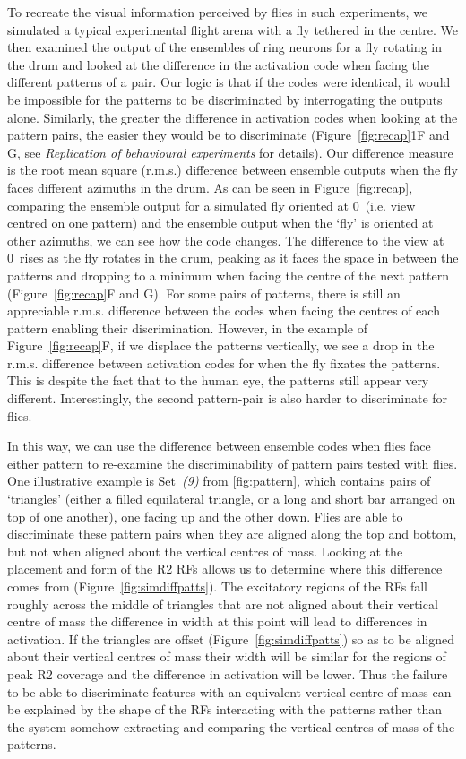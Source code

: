 \documentclass[10pt]{article}
\begin{document}
To recreate the visual information perceived by flies in such experiments, we simulated a typical experimental flight arena with a fly tethered in the centre. We then examined the output of the ensembles of ring neurons for a fly rotating in the drum and looked at the difference in the activation code when facing the different patterns of a pair. Our logic is that if the codes were identical, it would be impossible for the patterns to be discriminated by interrogating the outputs alone. Similarly, the greater the difference in activation codes when looking at the pattern pairs, the easier they would be to discriminate (Figure~\ref{fig:recap}1F and G, see \emph{Replication of behavioural experiments} for details). Our difference measure is the root mean square (r.m.s.) difference between ensemble outputs when the fly faces different azimuths in the drum. As can be seen in Figure~\ref{fig:recap}, comparing the ensemble output for a simulated fly oriented at 0\degree\ (i.e. view centred on one pattern) and the ensemble output when the ‘fly’ is oriented at other azimuths, we can see how the code changes. The difference to the view at 0\degree\ rises as the fly rotates in the drum, peaking as it faces the space in between the patterns and dropping to a minimum when facing the centre of the next pattern (Figure~\ref{fig:recap}F and G). For some pairs of patterns, there is still an appreciable r.m.s. difference between the codes when facing the centres of each pattern enabling their discrimination. However, in the example of Figure~\ref{fig:recap}F, if we displace the patterns vertically, we see a drop in the r.m.s. difference between activation codes for when the fly fixates the patterns. This is despite the fact that to the human eye, the patterns still appear very different. Interestingly, the second pattern-pair is also harder to discriminate for flies.

In this way, we can use the difference between ensemble codes when flies face either pattern to re-examine the discriminability of pattern pairs tested with flies. One illustrative example is Set~\emph{(9)} from \ref{fig:pattern}, which contains pairs of ‘triangles’ (either a filled equilateral triangle, or a long and short bar arranged on top of one another), one facing up and the other down. Flies are able to discriminate these pattern pairs when they are aligned along the top and bottom, but not when aligned about the vertical centres of mass\cite{Ernst1999}. Looking at the placement and form of the R2 RFs allows us to determine where this difference comes from (Figure~\ref{fig:simdiffpatts}). The excitatory regions of the RFs fall roughly across the middle of triangles that are not aligned about their vertical centre of mass the difference in width at this point will lead to differences in activation. If the triangles are offset (Figure~\ref{fig:simdiffpatts}) so as to be aligned about their vertical centres of mass their width will be similar for the regions of peak R2 coverage and the difference in activation will be lower. Thus the failure to be able to discriminate features with an equivalent vertical centre of mass can be explained by the shape of the RFs interacting with the patterns rather than the system somehow extracting and comparing the vertical centres of mass of the patterns.
\end{document}
